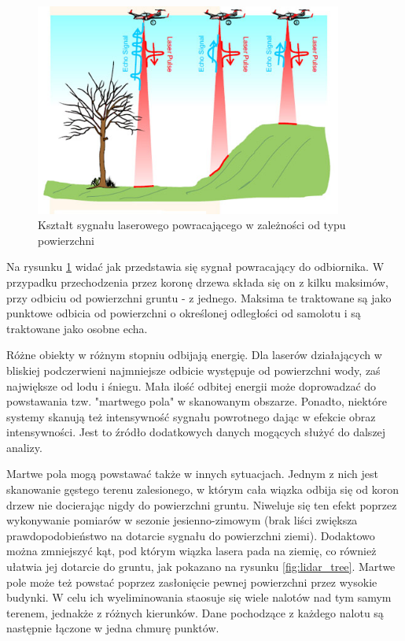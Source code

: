 \begin{figure}[h!]
    \centering
    \includegraphics[width=0.9\textwidth]{img/lidar_beam.jpg}
    \caption{Kształt sygnału laserowego powracającego w zależności od typu powierzchni}
    \label{fig:lidar_beam}
\end{figure}

Na rysunku \ref{fig:lidar_beam} widać jak przedstawia się sygnał powracający do odbiornika. W przypadku przechodzenia przez koronę drzewa składa się on z kilku
maksimów, przy odbiciu od powierzchni gruntu - z jednego. Maksima te traktowane są jako punktowe odbicia od powierzchni o określonej odległości od samolotu i są traktowane
jako osobne echa.

Różne obiekty w różnym stopniu odbijają energię. Dla laserów działających w bliskiej podczerwieni najmniejsze odbicie występuje od powierzchni wody,
zaś największe od lodu i śniegu. Mała ilość odbitej energii może doprowadzać do powstawania tzw. "martwego pola" w skanowanym obszarze. Ponadto, niektóre
systemy skanują też intensywność sygnału powrotnego dając w efekcie obraz intensywności. Jest to źródło dodatkowych danych mogących służyć do dalszej analizy.

Martwe pola mogą powstawać także w innych sytuacjach. Jednym z nich jest skanowanie gęstego terenu zalesionego, w którym cała wiązka odbija się od koron drzew
nie docierając nigdy do powierzchni gruntu. Niweluje się ten efekt poprzez wykonywanie pomiarów w sezonie jesienno-zimowym (brak liści zwiększa prawdopodobieństwo
na dotarcie sygnału do powierzchni ziemi). Dodaktowo można zmniejszyć kąt, pod którym wiązka lasera pada na ziemię, co również ułatwia jej dotarcie do gruntu,
jak pokazano na rysunku \ref{fig:lidar_tree}. Martwe pole może też powstać poprzez zasłonięcie pewnej powierzchni przez wysokie budynki. W celu ich wyeliminowania
staosuje się wiele nalotów nad tym samym terenem, jednakże z różnych kierunków. Dane pochodzące z każdego nalotu są następnie łączone w jedna chmurę punktów.

